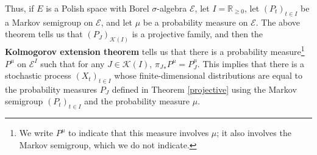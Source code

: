 \documentclass{article}
\theoremstyle{definition}
\theoremstyle{definition}
\begin{document}
Thus, if $E$ is a Polish space with Borel $\sigma$-algebra $\mathscr{E}$,
let $I=\mathbb{R}_{\geq 0}$,
let $(P_t)_{t \in I}$ be a Markov semigroup 
on $\mathscr{E}$, and let $\mu$ be a probability measure on $\mathscr{E}$.
The above theorem tells us that $(P_J)_{\mathscr{K}(I)}$ is a projective family, and then
the \textbf{Kolmogorov extension theorem}
tells us that there is a probability measure\footnote{We write $P^\mu$ to indicate that this measure
involves $\mu$; it also involves the Markov semigroup, which we do not indicate.} $P^\mu$ on $\mathscr{E}^I$ such that 
for any $J \in \mathscr{K}(I)$, ${\pi_J}_* P^\mu = P^\mu_J$. This implies that
there is a stochastic process 
$(X_t)_{t \in I}$ whose finite-dimensional distributions are equal 
to the probability measures $P_J$ defined in Theorem \ref{projective} using the Markov semigroup $(P_t)_{t \in I}$ and the probability
measure $\mu$. 
\end{document}
